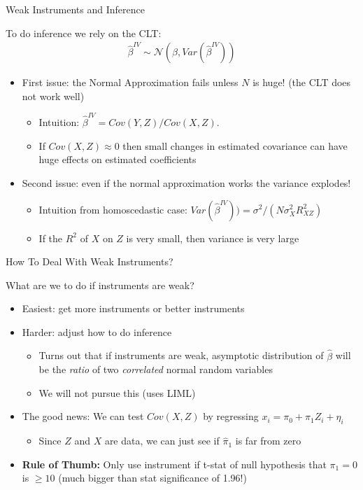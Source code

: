 \documentclass[aspectratio=169,11pt]{beamer}
\begin{document}
\begin{frame}{Weak Instruments and Inference}

To do inference we rely on the CLT:
\begin{align*}
	\hat\beta^{IV} \sim \mathcal{N}\left(\beta, Var\left(\hat\beta^{IV}\right)\right)
\end{align*}

\begin{itemize}
	\item First issue: the Normal Approximation fails unless $N$ is huge! (the CLT does not work well)
		\begin{itemize}
			\item Intuition: $\hat\beta^{IV} = Cov(Y,Z)/Cov(X,Z)$.
			\item If $Cov(X,Z)\approx 0$ then small changes in estimated covariance can have huge effects on estimated coefficients
		\end{itemize}
\medskip
	\item Second issue: even if the normal approximation works the variance explodes!
		\begin{itemize}
			\item Intuition from homoscedastic case: $Var(\hat\beta^{IV})) = \sigma^2/(N\sigma^2_XR^2_{XZ})$
			\item If the $R^2$ of $X$ on $Z$ is very small, then variance is very large
		\end{itemize}
\end{itemize}

\end{frame}

\begin{frame}{How To Deal With Weak Instruments?}

What are we to do if instruments are weak?

\begin{itemize}
		\item Easiest: get more instruments or better instruments
\medskip
		\item Harder: adjust how to do inference
			\begin{itemize}
				\item Turns out that if instruments are weak, asymptotic distribution of $\hat\beta$ will be the \emph{ratio} of two \emph{correlated} normal random variables
				\item We will not pursue this (uses LIML)
			\end{itemize}
\medskip
		\item The good news: We can test $Cov(X,Z)$ by regressing $x_i=\pi_0 + \pi_1 Z_i + \eta_i$
			\begin{itemize}
				\item Since $Z$ and $X$ are data, we can just see if $\hat{\pi}_1$ is far from zero
			\end{itemize}
\medskip
\item \textbf{Rule of Thumb:} Only use instrument if t-stat of null hypothesis that $\pi_1=0$ is $\geq 10$ (much bigger than stat significance of 1.96!)

\end{itemize}
\end{frame}
\end{document}
